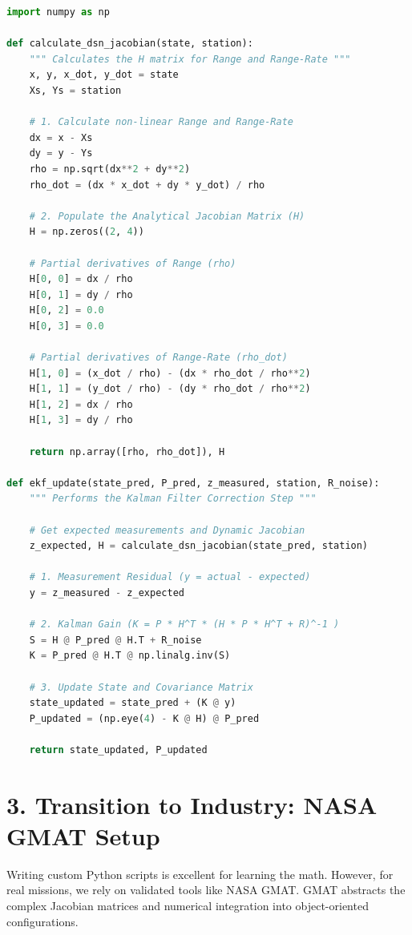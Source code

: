 \documentclass[11pt, letterpaper]{article}
\begin{document}
\begin{lstlisting}[language=Python, caption=EKF DSN Measurement Update (Range \& Doppler)]
import numpy as np

def calculate_dsn_jacobian(state, station):
    """ Calculates the H matrix for Range and Range-Rate """
    x, y, x_dot, y_dot = state
    Xs, Ys = station
    
    # 1. Calculate non-linear Range and Range-Rate
    dx = x - Xs
    dy = y - Ys
    rho = np.sqrt(dx**2 + dy**2)
    rho_dot = (dx * x_dot + dy * y_dot) / rho
    
    # 2. Populate the Analytical Jacobian Matrix (H)
    H = np.zeros((2, 4))
    
    # Partial derivatives of Range (rho)
    H[0, 0] = dx / rho
    H[0, 1] = dy / rho
    H[0, 2] = 0.0
    H[0, 3] = 0.0
    
    # Partial derivatives of Range-Rate (rho_dot)
    H[1, 0] = (x_dot / rho) - (dx * rho_dot / rho**2)
    H[1, 1] = (y_dot / rho) - (dy * rho_dot / rho**2)
    H[1, 2] = dx / rho
    H[1, 3] = dy / rho
    
    return np.array([rho, rho_dot]), H

def ekf_update(state_pred, P_pred, z_measured, station, R_noise):
    """ Performs the Kalman Filter Correction Step """
    
    # Get expected measurements and Dynamic Jacobian
    z_expected, H = calculate_dsn_jacobian(state_pred, station)
    
    # 1. Measurement Residual (y = actual - expected)
    y = z_measured - z_expected
    
    # 2. Kalman Gain (K = P * H^T * (H * P * H^T + R)^-1 )
    S = H @ P_pred @ H.T + R_noise
    K = P_pred @ H.T @ np.linalg.inv(S)
    
    # 3. Update State and Covariance Matrix
    state_updated = state_pred + (K @ y)
    P_updated = (np.eye(4) - K @ H) @ P_pred
    
    return state_updated, P_updated
\end{lstlisting}

\section*{3. Transition to Industry: NASA GMAT Setup}

Writing custom Python scripts is excellent for learning the math. However, for real missions, we rely on validated tools like NASA GMAT. GMAT abstracts the complex Jacobian matrices and numerical integration into object-oriented configurations.
\end{document}
